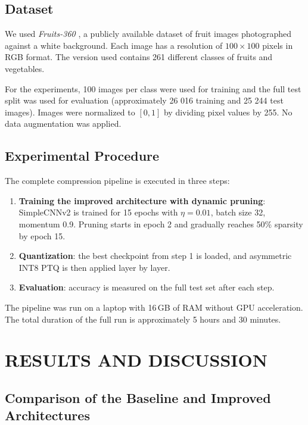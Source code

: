 \documentclass[letterpaper, 10 pt, conference]{ieeeconf}
\begin{document}
\subsection{Dataset}

We used \textit{Fruits-360} \cite{fruits360}, a publicly available dataset of fruit images photographed against a white background.
Each image has a resolution of $100\times100$ pixels in RGB format.
The version used contains 261 different classes of fruits and vegetables.

For the experiments, 100 images per class were used for training and the full test split was used for evaluation (approximately 26 016 training and 25 244 test images).
Images were normalized to $[0,1]$ by dividing pixel values by 255.
No data augmentation was applied.

\subsection{Experimental Procedure}

The complete compression pipeline is executed in three steps:
\begin{enumerate}
  \item \textbf{Training the improved architecture with dynamic pruning}: SimpleCNNv2 is trained for 15 epochs with $\eta = 0.01$, batch size 32, momentum 0.9. Pruning starts in epoch 2 and gradually reaches 50\% sparsity by epoch 15.
  \item \textbf{Quantization}: the best checkpoint from step 1 is loaded, and asymmetric INT8 PTQ is then applied layer by layer.
  \item \textbf{Evaluation}: accuracy is measured on the full test set after each step.
\end{enumerate}

The pipeline was run on a laptop with 16\,GB of RAM without GPU acceleration. The total duration of the full run is approximately 5 hours and 30 minutes.

\section{\textbf{RESULTS AND DISCUSSION}}

\subsection{Comparison of the Baseline and Improved Architectures}
\end{document}
